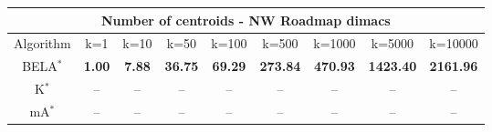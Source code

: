 \begin{tabular}{c|cccccccc}\toprule
\multicolumn{9}{c}{Number of centroids - NW Roadmap dimacs}\\ \midrule
Algorithm & k=1 & k=10 & k=50 & k=100 & k=500 & k=1000 & k=5000 & k=10000 \\ \midrule
BELA$^*$ & \textbf{1.00} & \textbf{7.88} & \textbf{36.75} & \textbf{69.29} & \textbf{273.84} & \textbf{470.93} & \textbf{1423.40} & \textbf{2161.96} \\
K$^*$ & -- & -- & -- & -- & -- & -- & -- & -- \\
mA$^*$ & -- & -- & -- & -- & -- & -- & -- & -- \\ \bottomrule 
\end{tabular}
